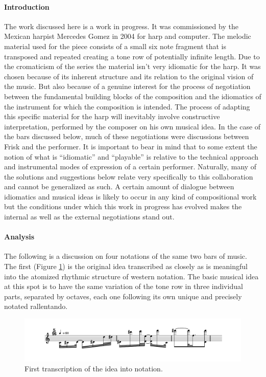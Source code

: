 \documentclass[10pt,letterpaper]{article}
\begin{document}
\paragraph{Introduction}
The work discussed here is a work in progress. It was commissioned by
the Mexican harpist Mercedes Gomez in 2004 for harp and computer. The
melodic material used for the piece consists of a small six note
fragment that is transposed and repeated creating a tone row of
potentially infinite length. Due to the cromaticism of the series the
material isn't very idiomatic for the harp. It was chosen because of its
inherent structure and its relation to the original vision of the
music. But also because of a genuine interest for the process of
negotiation between the fundamental building blocks of the composition
and the idiomatics of the instrument for which the composition is
intended. The process of adapting this specific material for the harp will
inevitably involve constructive interpretation, performed by the
composer on his own musical idea. In the case of the bars discussed below, much of
these negotiations were discussions between Frisk and the performer.
It is important to bear in mind that to some extent the notion of what
is ``idiomatic'' and ``playable'' is relative to the technical approach
and instrumental modes of expression of a certain performer. Naturally,
many of the solutions and suggestions below relate very specifically to
this collaboration and cannot be generalized as such.  A certain amount
of dialogue between idiomatics and musical ideas is likely to occur in
any kind of compositional work but the conditions under which this work
in progress has evolved makes the internal as well as the external
negotiations stand out.

\paragraph{Analysis}
The following is a discussion on four notations of the same two bars of
music. The first (Figure \ref{harpex1}) is the original idea transcribed
as closely as is meaningful into the atomized rhythmic structure of
western notation. The basic musical idea at this spot is to have the
same variation of the tone row in three individual parts, separated by
octaves, each one following its own unique and precisely notated
rallentando.
\begin{figure}[!htp]
\includegraphics[width=1.0\columnwidth]{img/harpVersion1}
\caption{First transcription of the idea into notation.}
\label{harpex1}
\end{figure}
\end{document}
